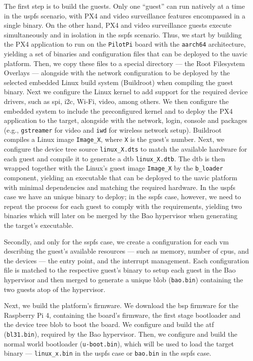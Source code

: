 The first step is to build the guests. Only one ``guest'' can run natively at a
time in the \gls{uspfs} scenario, with
PX4 and video surveillance features encompassed in a single binary. On the other
hand, PX4 and video surveillance guests execute simultaneously and in isolation
in the \gls{sspfs} scenario. Thus, we start by building the PX4 application to
run on the \texttt{PilotPi} board with the \texttt{aarch64} architecture,
yielding a set of binaries and configuration files that can be deployed to the
\gls{uavic} platform. Then, we copy these files to a special directory --- the
Root Filesystem Overlays --- alongside with the network configuration to be
deployed by the selected embedded Linux build system (Buildroot) when compiling
the guest binary.
Next we configure the Linux kernel to add support for the required device
drivers, such as \gls{spi}, \gls{i2c}, Wi-Fi, video, among others. We then
configure the embedded system to include the preconfigured kernel and to deploy
the PX4 application to the target, alongside with the network, login, console
and packages (e.g., \texttt{gstreamer} for video and \texttt{iwd} for wireless
network setup). Buildroot compiles a Linux image \texttt{Image\_X}, where
\texttt{X} is the guest's number. Next, we configure the device tree source \texttt{linux\_X.dts} to
match the available hardware for each guest and compile it to generate a \gls{dtb} \texttt{linux\_X.dtb}. The \gls{dtb} is then wrapped together
with the Linux's guest image \texttt{Image\_X} by the \texttt{b\_loader}
component, yielding an executable that can be deployed to the \gls{uavic}
platform with minimal dependencies and matching the required hardware. In the
\gls{uspfs} case we have an unique binary to deploy; in the \gls{sspfs} case,
however, we need to repeat the process for each guest to comply with the
requirements, yielding two binaries which will later on be merged by the Bao
hypervisor when generating the target's executable.

Secondly, and only for the \gls{sspfs} case, we create a configuration for each
\gls{vm} describing the guest's available resources --- such as memory, number
of \glspl{cpu}, and the devices --- the entry point, and the interrupt
management. Each configuration file is matched to the respective guest's binary
to setup each guest in the Bao hypervisor and then merged to generate a unique
blob (\texttt{bao.bin}) containing the two guests atop of the hypervisor.

Next, we build the platform's firmware. We download the \gls{bsp} firmware for
the Raspberry Pi 4, containing the board's firmware, the first stage bootloader
and the device tree blob to boot the board. We configure and build the
\gls{atf} (\texttt{bl31.bin}), required by the Bao hypervisor. Then, we
configure and build the normal world bootloader (\texttt{u-boot.bin}), which
will be used to load the target binary --- \texttt{linux\_x.bin} in the
\gls{uspfs} case or \texttt{bao.bin} in the \gls{sspfs} case.

